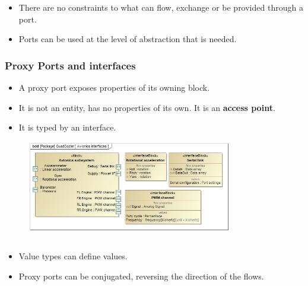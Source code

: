 \documentclass[xcolor=dvipsnames,t]{beamer}
\begin{document}
\begin{frame}
\begin{itemize}
\item There are no constraints to what can flow, exchange or be provided through a port.
\item Ports can be used at the level of abstraction that is needed.
\end{itemize}

\end{frame}

\vspace{-2mm}
\begin{frame}
\frametitle{Proxy Ports and interfaces}
\begin{itemize}
\item A proxy port exposes properties of its owning block. 
\item It is not an entity, has no properties of its own. It is an \textbf{access point}.
\item  It is typed by an interface.
\end{itemize}
\vspace{-2mm}
\begin{figure}
 	\includegraphics[width=0.8\textwidth]{QuadAvionicsInterfaces.jpg}
\end{figure}



\vspace{-9mm}
\begin{columns}
\begin{column}{0.5\textwidth}

\begin{itemize}
\item Value types can define values.
\item Proxy ports can be conjugated, reversing the direction of the flows.
\end{itemize}
\end{column}


\end{columns}
\end{frame}
\end{document}
